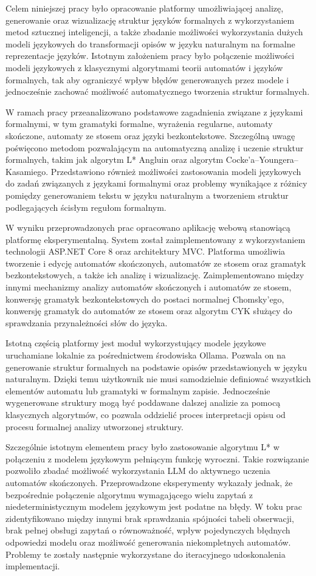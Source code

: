 \documentclass[12pt]{article}
\begin{document}
Celem niniejszej pracy było opracowanie platformy umożliwiającej analizę, generowanie oraz wizualizację struktur języków formalnych z wykorzystaniem metod sztucznej inteligencji, a także zbadanie możliwości wykorzystania dużych modeli językowych do transformacji opisów w języku naturalnym na formalne reprezentacje języków. Istotnym założeniem pracy było połączenie możliwości modeli językowych z klasycznymi algorytmami teorii automatów i języków formalnych, tak aby ograniczyć wpływ błędów generowanych przez modele i jednocześnie zachować możliwość automatycznego tworzenia struktur formalnych.

W ramach pracy przeanalizowano podstawowe zagadnienia związane z językami formalnymi, w tym gramatyki formalne, wyrażenia regularne, automaty skończone, automaty ze stosem oraz języki bezkontekstowe. Szczególną uwagę poświęcono metodom pozwalającym na automatyczną analizę i uczenie struktur formalnych, takim jak algorytm L* Angluin oraz algorytm Cocke'a--Youngera--Kasamiego. Przedstawiono również możliwości zastosowania modeli językowych do zadań związanych z językami formalnymi oraz problemy wynikające z różnicy pomiędzy generowaniem tekstu w języku naturalnym a tworzeniem struktur podlegających ścisłym regułom formalnym.

W wyniku przeprowadzonych prac opracowano aplikację webową stanowiącą platformę eksperymentalną. System został zaimplementowany z wykorzystaniem technologii ASP.NET Core 8 oraz architektury MVC. Platforma umożliwia tworzenie i edycję automatów skończonych, automatów ze stosem oraz gramatyk bezkontekstowych, a także ich analizę i wizualizację. Zaimplementowano między innymi mechanizmy analizy automatów skończonych i automatów ze stosem, konwersję gramatyk bezkontekstowych do postaci normalnej Chomsky'ego, konwersję gramatyk do automatów ze stosem oraz algorytm CYK służący do sprawdzania przynależności słów do języka.

Istotną częścią platformy jest moduł wykorzystujący modele językowe uruchamiane lokalnie za pośrednictwem środowiska Ollama. Pozwala on na generowanie struktur formalnych na podstawie opisów przedstawionych w języku naturalnym. Dzięki temu użytkownik nie musi samodzielnie definiować wszystkich elementów automatu lub gramatyki w formalnym zapisie. Jednocześnie wygenerowane struktury mogą być poddawane dalszej analizie za pomocą klasycznych algorytmów, co pozwala oddzielić proces interpretacji opisu od procesu formalnej analizy utworzonej struktury.

Szczególnie istotnym elementem pracy było zastosowanie algorytmu L* w połączeniu z modelem językowym pełniącym funkcję wyroczni. Takie rozwiązanie pozwoliło zbadać możliwość wykorzystania LLM do aktywnego uczenia automatów skończonych. Przeprowadzone eksperymenty wykazały jednak, że bezpośrednie połączenie algorytmu wymagającego wielu zapytań z niedeterministycznym modelem językowym jest podatne na błędy. W toku prac zidentyfikowano między innymi brak sprawdzania spójności tabeli obserwacji, brak pełnej obsługi zapytań o równoważność, wpływ pojedynczych błędnych odpowiedzi modelu oraz możliwość generowania niekompletnych automatów. Problemy te zostały następnie wykorzystane do iteracyjnego udoskonalenia implementacji.
\end{document}
